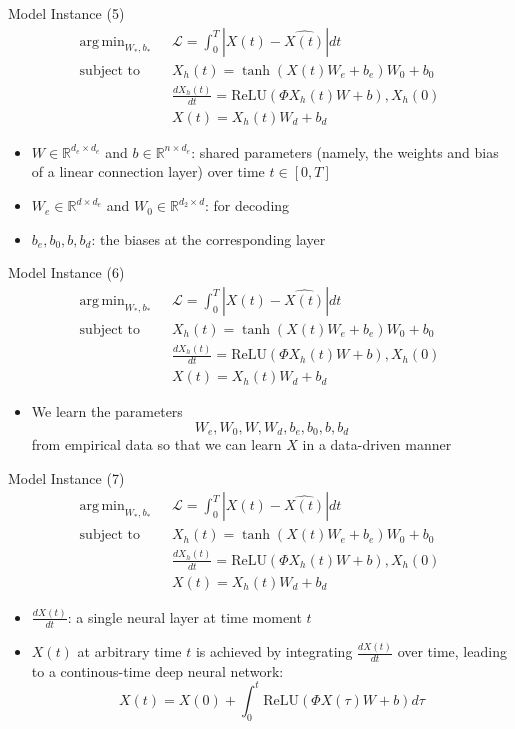 \documentclass{beamer}
\DeclareMathOperator*{\argmin}{arg\,min}
\begin{document}
\begin{frame}{Model Instance (5)}\[
\begin{split}
\argmin_{W_*,b_*}\text{ }&\mathcal{L}=\int_0^T|X(t)-\hat{X(t)}|dt\\
\text{subject to }&X_h(t)=\tanh(X(t)W_e+b_e)W_0+b_0\\
&\frac{dX_h(t)}{dt}=\text{ReLU}(\Phi X_h(t)W+b),X_h(0)\\
&X(t)=X_h(t)W_d+b_d
\end{split}
\]
\begin{itemize}
\item $W\in\mathbb{R}^{d_e\times d_e}$ and $b\in\mathbb{R}^{n\times d_e}$: shared parameters (namely, the weights and bias of a linear connection layer) over time $t\in[0,T]$
\item $W_e\in\mathbb{R}^{d\times d_e}$ and $W_0\in\mathbb{R}^{d_2\times d}$: for decoding
\item $b_e,b_0,b,b_d$: the biases at the corresponding layer
\end{itemize}
\end{frame}

\begin{frame}{Model Instance (6)}\[
\begin{split}
\argmin_{W_*,b_*}\text{ }&\mathcal{L}=\int_0^T|X(t)-\hat{X(t)}|dt\\
\text{subject to }&X_h(t)=\tanh(X(t)W_e+b_e)W_0+b_0\\
&\frac{dX_h(t)}{dt}=\text{ReLU}(\Phi X_h(t)W+b),X_h(0)\\
&X(t)=X_h(t)W_d+b_d
\end{split}
\]
\begin{itemize}
\item We learn the parameters\[
W_e,W_0,W,W_d,b_e,b_0,b,b_d
\]from empirical data so that we can learn $X$ in a data-driven manner
\end{itemize}
\end{frame}


\begin{frame}{Model Instance (7)}\[
\begin{split}
\argmin_{W_*,b_*}\text{ }&\mathcal{L}=\int_0^T|X(t)-\hat{X(t)}|dt\\
\text{subject to }&X_h(t)=\tanh(X(t)W_e+b_e)W_0+b_0\\
&\frac{dX_h(t)}{dt}=\text{ReLU}(\Phi X_h(t)W+b),X_h(0)\\
&X(t)=X_h(t)W_d+b_d
\end{split}
\]
\begin{itemize}
\item $\frac{dX(t)}{dt}$: a single neural layer at time moment $t$
\item $X(t)$ at arbitrary time $t$ is achieved by integrating $\frac{dX(t)}{dt}$ over time, leading to a continous-time deep neural network:\[
X(t)=X(0)+\int_0^t\text{ReLU}(\Phi X(\tau)W+b)d\tau
\]
\end{itemize}
\end{frame}
\end{document}
